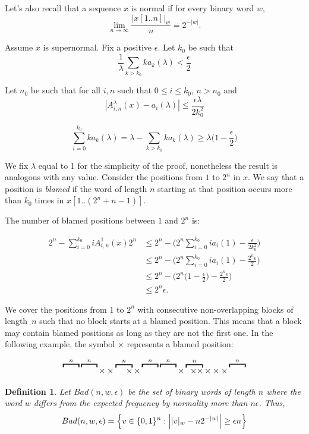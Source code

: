 \documentclass[11pt,a4paper]{tesis}
\newtheorem{definition}{Definition}[]
\begin{document}
Let's also recall that a sequence $x$ is normal if  for every binary word $w$,
\[
\lim_{n\to\infty} \frac{|x[1..n]|_w}{n}= 2^{-|w|}.
\]

Assume  $x$ is supernormal.
Fix a positive $\epsilon$.
Let $k_0$ be such that 
$$\frac{1}{\lambda} \sum_{k > k_0} ka_k(\lambda) < \frac{\epsilon}{2}$$

Let $n_0$ be  such that  for all 
$ i,n$ such that $  0 \leq i \leq k_0 $, $n > n_0$ and 
  $$|A^\lambda_{i,n}(x) - a_i(\lambda)| \leq \frac{\epsilon\lambda}{2k_0^2}$$


 $$\sum_{i=0}^{k_0} ka_k(\lambda) = \lambda - \sum_{k> k_0} ka_k(\lambda) \geq \lambda\Big(1 - \frac{\epsilon}{2}\Big)$$


We fix $\lambda$ equal to 1 for the simplicity of the proof, nonetheless the result is analogous with any value.
Consider the positions from $1$ to $ 2^n $ in $x$. 
We say that a position is \textit{blamed} if the word of length $n$ starting at that position 
occurs more than $k_0$ times in 
 $x[1..(2^n+n-1)]$. 

 The number of blamed positions 
 between  $1$ and $2^n$ is:

\begin{align*}
   2^n -  \sum_{i=0}^{k_0} iA^{1}_{i,n}(x) 2^n 
     &\leq 2^n - \Big(2^n\sum_{i=0}^{k_0} i a_i(1) - \frac{\epsilon}{2k^2_0}\Big) \\
    &\leq 2^n -  \Big(2^n \sum_{i=0}^{k_0} ia_{i}(1) - \frac{2^n\epsilon}{2} \Big)\\
    &\leq 2^n - \Big(2^n \big(1-\frac{\epsilon}{2}\big) - \frac{2^n\epsilon }{2}\Big) \\
    &\leq 2^n\epsilon.
\end{align*}

We cover the positions from $1 $ to $2^n$ with consecutive
 non-overlapping blocks of length~$n$ such that 
no block starts at a blamed  position. 
This means that a block may contain blamed positions as long as they are not the first one. 
In the following example, the symbol $\times$ represents a blamed position:
 
$$\overbracket{\raisebox{6.4pt}{\qquad}}^{n} \overbracket{\raisebox{6.4pt}{\qquad}}^{n}\times\times\overbracket{\;\quad \times}^{n} \times \overbracket{\raisebox{6.4pt}{\qquad}}^{n} \overbracket{\raisebox{6.4pt}{\qquad}}^{n} \times \overbracket{\;\; \times \times}^{n} \times\times\times \overbracket{\raisebox{6.4pt}{\qquad}}^{n}$$


\begin{definition}
  Let $Bad(n, w, \epsilon)$ be the set of binary words of length $n$ where the word $w$ differs from the expected frequency by normality
 more than $n \epsilon$. Thus,
  $$Bad(n, w, \epsilon)=\Big{\{}v\in \{0,1\}^n: \Big{|} |v|_w - n 2^{-|w|} \Big{|} \geq \epsilon n \Big{\} }$$
\end{definition}
\end{document}
